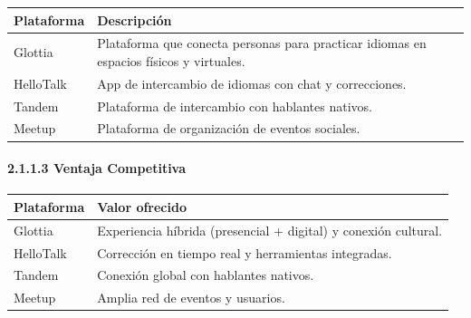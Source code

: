 {\def\LTcaptype{none} %
\begin{longtable}[]{@{}
  >{\raggedright\arraybackslash}p{}
  >{\raggedright\arraybackslash}p{}@{}}
\toprule\noalign{}
\begin{minipage}[b]{\linewidth}\raggedright
Plataforma
\end{minipage} & \begin{minipage}[b]{\linewidth}\raggedright
Descripción
\end{minipage} \\
\midrule\noalign{}
\endhead
\bottomrule\noalign{}
\endlastfoot
Glottia & Plataforma que conecta personas para practicar idiomas en
espacios físicos y virtuales. \\
HelloTalk & App de intercambio de idiomas con chat y correcciones. \\
Tandem & Plataforma de intercambio con hablantes nativos. \\
Meetup & Plataforma de organización de eventos sociales. \\
\end{longtable}
}

\paragraph{2.1.1.3 Ventaja
Competitiva}\label{report__20-cap2-requirements-analysis.md__ventaja-competitiva}

{\def\LTcaptype{none} %
\begin{longtable}[]{@{}
  >{\raggedright\arraybackslash}p{}
  >{\raggedright\arraybackslash}p{}@{}}
\toprule\noalign{}
\begin{minipage}[b]{\linewidth}\raggedright
Plataforma
\end{minipage} & \begin{minipage}[b]{\linewidth}\raggedright
Valor ofrecido
\end{minipage} \\
\midrule\noalign{}
\endhead
\bottomrule\noalign{}
\endlastfoot
Glottia & Experiencia híbrida (presencial + digital) y conexión
cultural. \\
HelloTalk & Corrección en tiempo real y herramientas integradas. \\
Tandem & Conexión global con hablantes nativos. \\
Meetup & Amplia red de eventos y usuarios. \\
\end{longtable}
}

